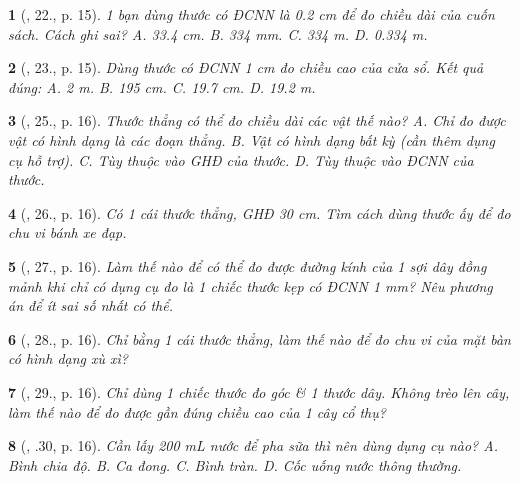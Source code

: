 \documentclass{article}
\newtheorem{baitoan}{}
\begin{document}
\begin{baitoan}[\cite{ncpt_KHTN_6_tap_1}, 22., p. 15]
	1 bạn dùng thước có {\rm ĐCNN} là {\rm0.2 cm} để đo chiều dài của cuốn sách. Cách ghi sai? {\sf A.} {\rm33.4 cm}. {\sf B.} {\rm334 mm}. {\sf C.} {\rm334 m}. {\sf D.} {\rm0.334 m}.
\end{baitoan}

\begin{baitoan}[\cite{ncpt_KHTN_6_tap_1}, 23., p. 15]
	Dùng thước có {\rm ĐCNN 1 cm} đo chiều cao của cửa sổ. Kết quả đúng: {\sf A.} {\rm2 m}. {\sf B.} {\rm195 cm}. {\sf C.} {\rm19.7 cm}. {\sf D.} {\rm19.2 m}.
\end{baitoan}

\begin{baitoan}[\cite{ncpt_KHTN_6_tap_1}, 25., p. 16]
	Thước thẳng có thể đo chiều dài các vật thế nào? {\sf A.} Chỉ đo được vật có hình dạng là các đoạn thẳng. {\sf B.} Vật có hình dạng bất kỳ (cần thêm dụng cụ hỗ trợ). {\sf C.} Tùy thuộc vào {\rm GHĐ} của thước. {\sf D.} Tùy thuộc vào {\rm ĐCNN} của thước.
\end{baitoan}

\begin{baitoan}[\cite{ncpt_KHTN_6_tap_1}, 26., p. 16]
	Có 1 cái thước thẳng, {\rm GHĐ 30 cm}. Tìm cách dùng thước ấy để đo chu vi bánh xe đạp.
\end{baitoan}

\begin{baitoan}[\cite{ncpt_KHTN_6_tap_1}, 27., p. 16]
	Làm thế nào để có thể đo được đường kính của 1 sợi dây đồng mảnh khi chỉ có dụng cụ đo là 1 chiếc thước kẹp có {\rm ĐCNN 1 mm}? Nêu phương án để ít sai số nhất có thể.
\end{baitoan}

\begin{baitoan}[\cite{ncpt_KHTN_6_tap_1}, 28., p. 16]
	Chỉ bằng 1 cái thước thẳng, làm thế nào để đo chu vi của mặt bàn có hình dạng xù xì?
\end{baitoan}

\begin{baitoan}[\cite{ncpt_KHTN_6_tap_1}, 29., p. 16]
	Chỉ dùng 1 chiếc thước đo góc \& 1 thước dây. Không trèo lên cây, làm thế nào để đo được gần đúng chiều cao của 1 cây cổ thụ?
\end{baitoan}

\begin{baitoan}[\cite{ncpt_KHTN_6_tap_1}, .30, p. 16]
	Cần lấy {\rm200 mL} nước để pha sữa thì nên dùng dụng cụ nào? {\sf A.} Bình chia độ. {\sf B.} Ca đong. {\sf C.} Bình tràn. {\sf D.} Cốc uống nước thông thường.
\end{baitoan}
\end{document}
